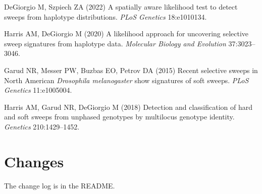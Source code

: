 \documentclass[11pt]{article}
\begin{document}
\begin{description}[leftmargin=0pt,style=nextline]
\item[saltiLASSI] DeGiorgio M, Szpiech ZA (2022) A spatially aware likelihood
  test to detect sweeps from haplotype distributions. \emph{PLoS Genetics}
  18:e1010134.
\item[LASSI] Harris AM, DeGiorgio M (2020) A likelihood approach for uncovering
  selective sweep signatures from haplotype data. \emph{Molecular Biology and
  Evolution} 37:3023--3046.
\item[H12 and H2/H1] Garud NR, Messer PW, Buzbas EO, Petrov DA (2015) Recent
  selective sweeps in North American \emph{Drosophila melanogaster} show
  signatures of soft sweeps. \emph{PLoS Genetics} 11:e1005004.
\item[G123 and G2/G1] Harris AM, Garud NR, DeGiorgio M (2018) Detection and
  classification of hard and soft sweeps from unphased genotypes by multilocus
  genotype identity. \emph{Genetics} 210:1429--1452.
\end{description}

\section*{Changes}

The change log is in the README.
\end{document}
